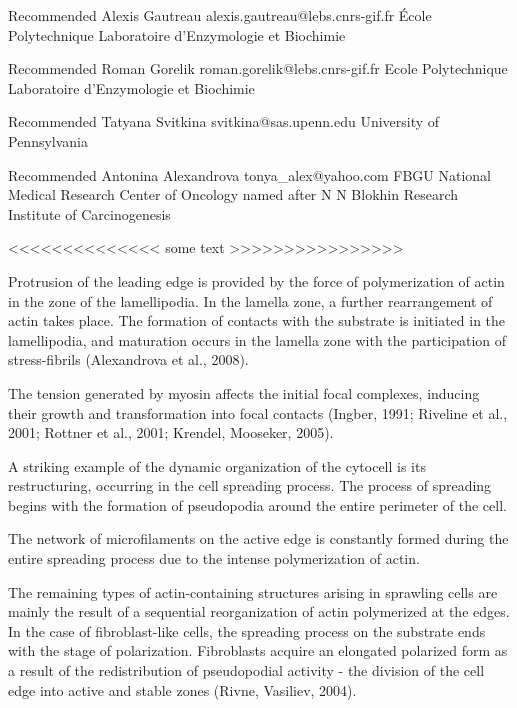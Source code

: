 \documentclass[num-refs]{wiley-article}
\begin{document}

Recommended
Alexis Gautreau
alexis.gautreau@lebs.cnrs-gif.fr
École Polytechnique
Laboratoire d'Enzymologie et Biochimie

Recommended
Roman Gorelik
roman.gorelik@lebs.cnrs-gif.fr
Ecole Polytechnique
Laboratoire d'Enzymologie et Biochimie

Recommended
Tatyana Svitkina
svitkina@sas.upenn.edu
University of Pennsylvania

Recommended
Antonina Alexandrova
tonya_alex@yahoo.com
FBGU National Medical Research Center of Oncology named after N N Blokhin Research Institute of Carcinogenesis

<<<<<<<<<<<<<< some text >>>>>>>>>>>>>>>>

Protrusion of the leading edge is provided by the force of polymerization of actin in the zone of the lamellipodia. In the lamella zone, a further rearrangement of actin takes place.
The formation of contacts with the substrate is initiated in the lamellipodia, and maturation occurs in the lamella zone with the participation of stress-fibrils (Alexandrova et al., 2008).


The tension generated by myosin affects the initial focal complexes, inducing their growth and transformation into focal contacts (Ingber, 1991; Riveline et al., 2001; Rottner et al., 2001; Krendel, Mooseker, 2005).

A striking example of the dynamic organization of the cytocell is its restructuring, occurring in the cell spreading process.
The process of spreading begins with the formation of pseudopodia around the entire perimeter of the cell.

The network of microfilaments on the active edge is constantly formed during the entire spreading process due to the intense polymerization of actin.

The remaining types of actin-containing structures arising in sprawling cells are mainly the result of a sequential reorganization of actin polymerized at the edges.
In the case of fibroblast-like cells, the spreading process on the substrate ends with the stage of polarization. Fibroblasts acquire an elongated polarized form as a result of the redistribution of pseudopodial activity - the division of the cell edge into active and stable zones (Rivne, Vasiliev, 2004).
\end{document}
